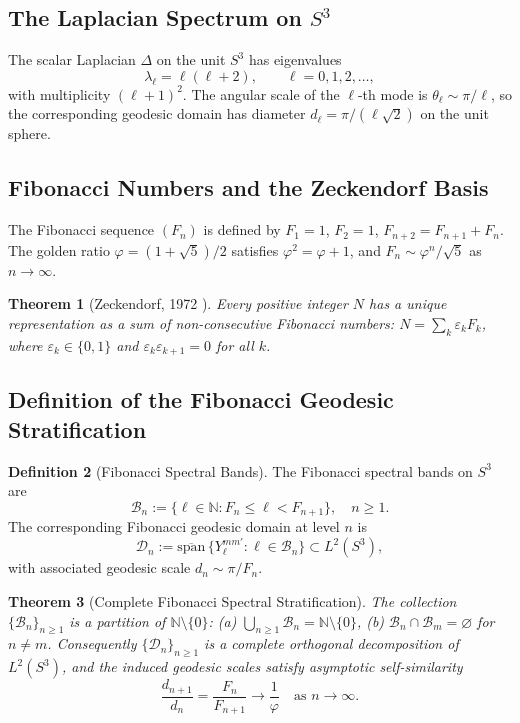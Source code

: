 \documentclass[12pt,a4paper]{article}
\newtheorem{theorem}{Theorem}[section]
\theoremstyle{definition}
\newtheorem{definition}[theorem]{Definition}
\theoremstyle{remark}
\begin{document}
\subsection{The Laplacian Spectrum on $S^3$}

The scalar Laplacian $\Delta$ on the unit $S^3$ has eigenvalues
\[
\lambda_\ell = \ell(\ell+2), \qquad \ell = 0,1,2,\ldots,
\]
with multiplicity $(\ell+1)^2$. The angular scale of the $\ell$-th mode is
$\theta_\ell \sim \pi/\ell$, so the corresponding geodesic domain has diameter
$d_\ell = \pi/(\ell\sqrt{2})$ on the unit sphere.

\subsection{Fibonacci Numbers and the Zeckendorf Basis}

The Fibonacci sequence $(F_n)$ is defined by $F_1=1$, $F_2=1$,
$F_{n+2}=F_{n+1}+F_n$. The golden ratio $\varphi = (1+\sqrt{5})/2$
satisfies $\varphi^2=\varphi+1$, and $F_n\sim\varphi^n/\sqrt{5}$ as $n\to\infty$.

\begin{theorem}[Zeckendorf, 1972 \cite{Zeckendorf1972}]
Every positive integer $N$ has a unique representation as a sum of
non-consecutive Fibonacci numbers: $N=\sum_k \varepsilon_k F_k$, where
$\varepsilon_k\in\{0,1\}$ and $\varepsilon_k\varepsilon_{k+1}=0$ for all $k$.
\end{theorem}

\subsection{Definition of the Fibonacci Geodesic Stratification}

\begin{definition}[Fibonacci Spectral Bands]
The Fibonacci spectral bands on $S^3$ are
\[
\mathcal{B}_n := \{\ell\in\mathbb{N}: F_n \leq \ell < F_{n+1}\},\quad n\geq 1.
\]
The corresponding Fibonacci geodesic domain at level $n$ is
\[
\mathcal{D}_n := \overline{\mathrm{span}}\,\{Y_\ell^{mm'}: \ell\in\mathcal{B}_n\}
\subset L^2(S^3),
\]
with associated geodesic scale $d_n \sim \pi/F_n$.
\end{definition}

\begin{theorem}[Complete Fibonacci Spectral Stratification]
The collection $\{\mathcal{B}_n\}_{n\geq 1}$ is a partition of $\mathbb{N}\setminus\{0\}$:
\textup{(a)} $\bigcup_{n\geq 1}\mathcal{B}_n = \mathbb{N}\setminus\{0\}$,
\textup{(b)} $\mathcal{B}_n\cap\mathcal{B}_m = \varnothing$ for $n\neq m$.
Consequently $\{\mathcal{D}_n\}_{n\geq 1}$ is a complete orthogonal decomposition
of $L^2(S^3)$, and the induced geodesic scales satisfy asymptotic self-similarity
\[
\frac{d_{n+1}}{d_n} = \frac{F_n}{F_{n+1}} \longrightarrow \frac{1}{\varphi}
\quad\text{as }n\to\infty.
\]
\end{theorem}
\end{document}
